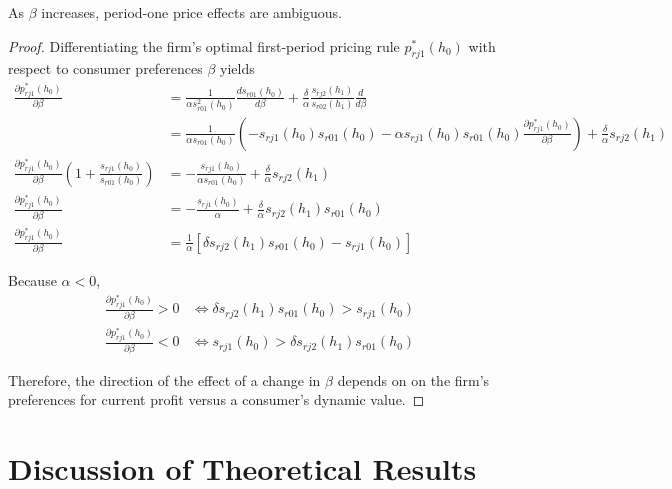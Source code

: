\begin{proposition}
\label{prop:four}
  As $\beta$ increases, period-one price effects are ambiguous.
\end{proposition}

\begin{proof}
  Differentiating the firm's optimal first-period pricing rule $p_{rj1}^*(h_0)$
  with respect to consumer preferences $\beta$ yields
  \begin{align*}
    \frac{\partial p_{rj1}^*(h_0)}{\partial\beta} &= \frac{1}{\alpha s_{r01}^2(h_0)}\frac{ds_{r01}(h_0)}{d\beta} + \frac{\delta}{\alpha}\frac{s_{rj2}(h_1)}{s_{r02}(h_1)}\frac{d}{d\beta}\\
    &=\frac{1}{\alpha s_{r01}(h_0)}(-s_{rj1}(h_0)s_{r01}(h_0) - \alpha
    s_{rj1}(h_0)s_{r01}(h_0)\frac{\partial p^*_{rj1}(h_0)}{\partial\beta}) +
    \frac{\delta}{\alpha}s_{rj2}(h_1)
    \\
    \frac{\partial
    p_{rj1}^*(h_0)}{\partial\beta}(1+\frac{s_{rj1}(h_0)}{s_{r01}(h_0)}) &=
    -\frac{s_{rj1}(h_0)}{\alpha s_{r01}(h_0)} +
    \frac{\delta}{\alpha}s_{rj2}(h_1) \\
    \frac{\partial p_{rj1}^*(h_0)}{\partial\beta} &=
    -\frac{s_{rj1}(h_0)}{\alpha} + \frac{\delta}{\alpha}s_{rj2}(h_1)s_{r01}(h_0)\\
    \frac{\partial p_{rj1}^*(h_0)}{\partial\beta} &=
    \frac{1}{\alpha}[\delta s_{rj2}(h_1)s_{r01}(h_0) - s_{rj1}(h_0)]
  \end{align*}

  Because $\alpha<0$,
  \begin{align}
    \frac{\partial p_{rj1}^*(h_0)}{\partial\beta} > 0 &\iff \delta
    s_{rj2}(h_1)s_{r01}(h_0) > s_{rj1}(h_0) \\
    \frac{\partial p_{rj1}^*(h_0)}{\partial\beta} < 0 &\iff s_{rj1}(h_0) > \delta
    s_{rj2}(h_1)s_{r01}(h_0)
  \end{align}

  Therefore, the direction of the effect of a change in $\beta$ depends on on
  the firm's preferences for current profit versus a consumer's dynamic value.
\end{proof}


\section{Discussion of Theoretical Results}
\label{sec:theory-discussion}

